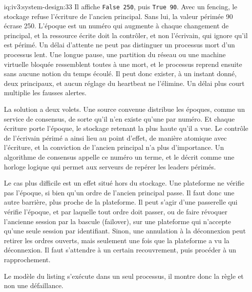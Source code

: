 \begin{solution}{iq:iv3:system-design:33}
Il affiche \texttt{False 250}, puis \texttt{True 90}. Avec un fencing, le stockage refuse l'écriture de l'ancien principal. Sans lui, la valeur périmée 90 écrase 250. L'époque est un numéro qui augmente à chaque changement de principal, et la ressource écrite doit la contrôler, et non l'écrivain, qui ignore qu'il est périmé.
Un délai d'attente ne peut pas distinguer un processus mort d'un processus lent. Une longue pause, une partition du réseau ou une machine virtuelle bloquée ressemblent toutes à une mort, et le processus reprend ensuite sans aucune notion du temps écoulé. Il peut donc exister, à un instant donné, deux principaux, et aucun réglage du heartbeat ne l'élimine. Un délai plus court multiplie les fausses alertes.

La solution a deux volets. Une source convenue distribue les époques, comme un service de consensus, de sorte qu'il n'en existe qu'une par numéro. Et chaque écriture porte l'époque, le stockage retenant la plus haute qu'il a vue. Le contrôle de l'écrivain périmé a ainsi lieu au point d'effet, de manière atomique avec l'écriture, et la conviction de l'ancien principal n'a plus d'importance. Un algorithme de consensus appelle ce numéro un terme, et le décrit comme une horloge logique qui permet aux serveurs de repérer les leaders périmés.

Le cas plus difficile est un effet situé hors du stockage. Une plateforme ne vérifie pas l'époque, si bien qu'un ordre de l'ancien principal passe. Il faut donc une autre barrière, plus proche de la plateforme. Il peut s'agir d'une passerelle qui vérifie l'époque, et par laquelle tout ordre doit passer, ou de faire révoquer l'ancienne session par la bascule (failover), sur une plateforme qui n'accepte qu'une seule session par identifiant. Sinon, une annulation à la déconnexion peut retirer les ordres ouverts, mais seulement une fois que la plateforme a vu la déconnexion. Il faut s'attendre à un certain recouvrement, puis procéder à un rapprochement.

Le modèle du listing s'exécute dans un seul processus, il montre donc la règle et non une défaillance.

\end{solution}

